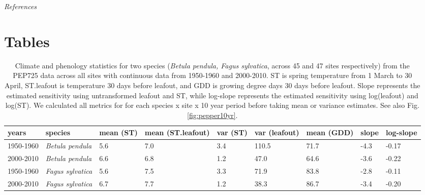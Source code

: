 \documentclass[11pt]{article}
\begin{document}
\emph{References}
\vspace{-6ex}


 
\clearpage
\section{Tables}
\vspace{-3ex}
\begin{table}[ht]
\centering
\caption{Climate and phenology statistics for two species (\emph{Betula pendula, Fagus sylvatica}, across 45 and 47 sites respectively) from the PEP725 data across all sites with continuous data from 1950-1960 and 2000-2010. ST is spring temperature from 1 March to 30 April, ST.leafout is temperature 30 days before leafout, and GDD is growing degree days 30 days before leafout. Slope represents the estimated sensitivity using untransformed leafout and ST, while log-slope represents the estimated sensitivity using log(leafout) and log(ST). We calculated all metrics for for each species  x site x 10 year period before taking mean or variance estimates. See also Fig. \ref{fig:pepper10yr}.} 
\label{tab:pep10yr}
\begingroup\footnotesize
\begin{tabular}{|p{}|p{}|p{}|p{}|p{}|p{}|p{}|p{}|p{}|}
  \hline
years & species & mean (ST) & mean (ST.leafout) & var (ST) & var (leafout) & mean (GDD) & slope & log-slope \\ 
  \hline
1950-1960 & \emph{Betula pendula} & 5.6 & 7.0 & 3.4 & 110.5 & 71.7 & -4.3 & -0.17 \\ 
  2000-2010 & \emph{Betula pendula} & 6.6 & 6.8 & 1.2 & 47.0 & 64.6 & -3.6 & -0.22 \\ 
  1950-1960 & \emph{Fagus sylvatica} & 5.6 & 7.5 & 3.3 & 71.9 & 83.8 & -2.8 & -0.11 \\ 
  2000-2010 & \emph{Fagus sylvatica} & 6.7 & 7.7 & 1.2 & 38.3 & 86.7 & -3.4 & -0.20 \\ 
   \hline
\end{tabular}
\endgroup
\end{table}
\end{document}

